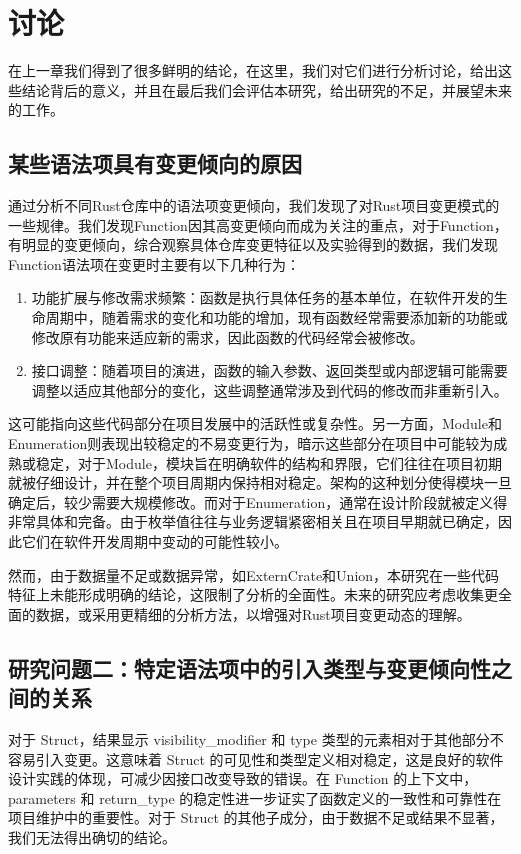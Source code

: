 \chapter{讨论}
在上一章我们得到了很多鲜明的结论，在这里，我们对它们进行分析讨论，给出这些结论背后的意义，并且在最后我们会评估本研究，给出研究的不足，并展望未来的工作。
\section{某些语法项具有变更倾向的原因}
通过分析不同Rust仓库中的语法项变更倾向，我们发现了对Rust项目变更模式的一些规律。我们发现Function因其高变更倾向而成为关注的重点，对于Function，有明显的变更倾向，综合观察具体仓库变更特征以及实验得到的数据，我们发现Function语法项在变更时主要有以下几种行为：
\begin{enumerate}
    \item 功能扩展与修改需求频繁：函数是执行具体任务的基本单位，在软件开发的生命周期中，随着需求的变化和功能的增加，现有函数经常需要添加新的功能或修改原有功能来适应新的需求，因此函数的代码经常会被修改。
    \item 接口调整：随着项目的演进，函数的输入参数、返回类型或内部逻辑可能需要调整以适应其他部分的变化，这些调整通常涉及到代码的修改而非重新引入。
\end{enumerate}

这可能指向这些代码部分在项目发展中的活跃性或复杂性。另一方面，Module和Enumeration则表现出较稳定的不易变更行为，暗示这些部分在项目中可能较为成熟或稳定，对于Module，模块旨在明确软件的结构和界限，它们往往在项目初期就被仔细设计，并在整个项目周期内保持相对稳定。架构的这种划分使得模块一旦确定后，较少需要大规模修改。而对于Enumeration，通常在设计阶段就被定义得非常具体和完备。由于枚举值往往与业务逻辑紧密相关且在项目早期就已确定，因此它们在软件开发周期中变动的可能性较小。

然而，由于数据量不足或数据异常，如ExternCrate和Union，本研究在一些代码特征上未能形成明确的结论，这限制了分析的全面性。未来的研究应考虑收集更全面的数据，或采用更精细的分析方法，以增强对Rust项目变更动态的理解。
\section{研究问题二：特定语法项中的引入类型与变更倾向性之间的关系}
对于 Struct，结果显示 visibility\_modifier 和 type 类型的元素相对于其他部分不容易引入变更。这意味着 Struct 的可见性和类型定义相对稳定，这是良好的软件设计实践的体现，可减少因接口改变导致的错误。在 Function 的上下文中，parameters 和 return\_type 的稳定性进一步证实了函数定义的一致性和可靠性在项目维护中的重要性。对于 Struct 的其他子成分，由于数据不足或结果不显著，我们无法得出确切的结论。

